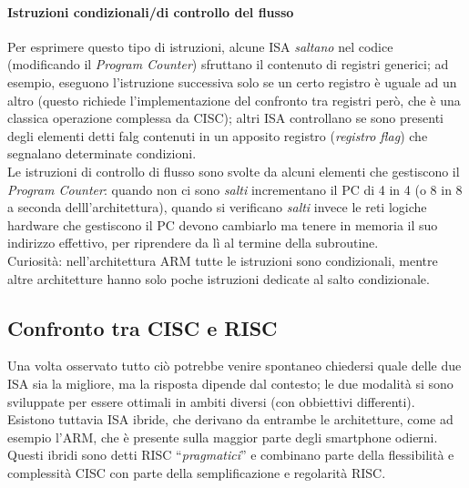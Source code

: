\paragraph*{Istruzioni condizionali/di controllo del flusso}
Per esprimere questo tipo di istruzioni, alcune ISA \textit{saltano} nel codice (modificando il \textit{Program Counter}) sfruttano il contenuto di registri generici; ad esempio, eseguono l’istruzione successiva solo se un certo registro è uguale ad un altro (questo richiede l’implementazione del confronto tra registri però, che è una classica operazione complessa da CISC); altri ISA controllano se sono presenti  degli elementi detti falg contenuti in un apposito registro (\textit{registro flag}) che segnalano determinate condizioni.\\
Le istruzioni di controllo di flusso sono svolte da alcuni elementi che gestiscono il \textit{Program Counter}: quando non ci sono \textit{salti} incrementano il PC di 4 in 4 (o 8 in 8 a seconda delll’architettura), quando si verificano \textit{salti} invece le reti logiche hardware che gestiscono il PC devono cambiarlo ma tenere in memoria il suo indirizzo effettivo, per riprendere da lì al termine della subroutine.\\
Curiosità: nell'architettura ARM tutte le istruzioni sono condizionali, mentre altre architetture hanno solo poche istruzioni dedicate al salto condizionale.

\subsection{Confronto tra CISC e RISC}


Una volta osservato tutto ciò potrebbe venire spontaneo chiedersi quale delle due ISA sia la migliore, ma la risposta dipende dal contesto; le due modalità si sono sviluppate per essere ottimali in ambiti diversi (con obbiettivi differenti).\\
Esistono tuttavia ISA ibride, che derivano da entrambe le architetture, come ad esempio l’ARM, che è presente sulla maggior parte degli smartphone odierni. Questi ibridi sono detti RISC “\textit{pragmatici}” e combinano parte della flessibilità e complessità  CISC con parte della semplificazione e regolarità RISC.

